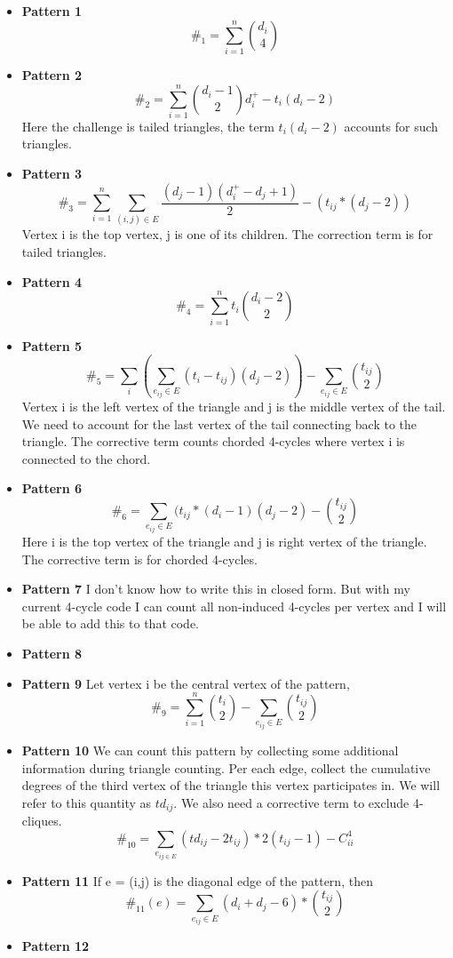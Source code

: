 \documentclass{siamltex}
\begin{document}
\begin{itemize} 
\item {\bf Pattern 1}
\[ \#_1=\sum_{i=1}^n {d_i \choose 4} \] 
\item{\bf Pattern 2} 
\[\#_2=\sum_{i=1}^n {d_i-1 \choose 2} d_i^+-t_i(d_i-2) \]
Here the challenge is tailed triangles,  the term $t_i(d_i-2)$ accounts  for such triangles. 
\item{\bf Pattern 3} 
\[\#_3= \sum_{i=1}^n \sum_{(i,j)\in E} \frac{(d_j-1)(d^+_i-d_j+1)}{2} -(t_{ij}*(d_j-2)) \] 
Vertex i is the top vertex, j is one of its  children. The correction term is for tailed triangles. 
\item{\bf Pattern 4} 
\[\#_4= \sum_{i=1}^n t_i {d_i-2\choose 2}  \] 
\item{\bf Pattern 5} 
\[ \#_5= \sum_i (\sum_{e_{ij}\in E} (t_i-t_{ij})(d_j-2)) -\sum_{e_{ij}\in E}{t_{ij}\choose 2}  \] 
Vertex i is the left vertex of the triangle and j  is the middle vertex of the tail.   We need to account for the last vertex of the tail connecting back to the triangle.  The corrective term  counts chorded 4-cycles where vertex i  is connected to the chord. 
\item{\bf Pattern 6} 
\[ \#_6= \sum_{e_{ij}\in E} (t_{ij}*(d_i-1)(d_j-2) -{t_{ij}\choose 2}  \] 
Here i is the top vertex of the triangle and  j is  right vertex of the triangle.  The corrective term is for chorded 4-cycles.
\item{\bf Pattern 7}
I don't know how to  write this in  closed form. But with my current 4-cycle code I can count all non-induced 4-cycles per vertex and  I will be able to add this to  that code. 
\item{\bf Pattern 8}
\item{\bf Pattern 9}
 Let vertex i be the  central vertex of the pattern,
 \[    \#_9 = \sum_{i=1}^n {t_i \choose 2} - \sum_{e_{ij}\in E } {t_{ij} \choose 2} \]
\item{\bf Pattern 10}
 We  can count this pattern by collecting some additional information  during triangle counting. Per each edge, collect the cumulative degrees  of the third vertex of the triangle this vertex participates in. We will refer to this quantity as $td_{ij}$. We also  need a corrective term  to exclude 4-cliques. 
 \[   \#_{10} = \sum_{e_{ij \in E}} (td_{ij}-2t_{ij}) *2(t_{ij} - 1) - C^4_{ii}\]
\item{\bf Pattern 11}
If e = (i,j) is the diagonal edge of the pattern, then
   \[ \#_{11}(e) = \sum_{e_{ij}\in E} (d_i+d_j - 6) * {t_{ij} \choose 2}  \] 
\item{\bf Pattern 12}

\end{itemize}
\end{document}
